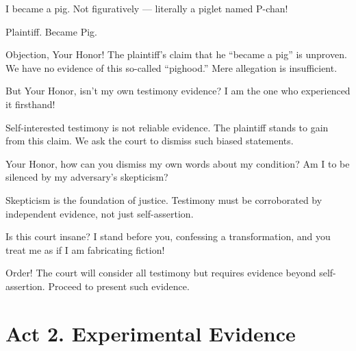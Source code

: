 \documentclass[12pt]{article}
\begin{document}
\begin{tcolorbox}[title={Ryoga (continued):}]
I became a pig. Not figuratively — literally a piglet named P-chan!
\end{tcolorbox}

\begin{tcolorbox}[title={Court Clerk (scribbling):}]
Plaintiff. Became Pig.
\end{tcolorbox}

\begin{tcolorbox}[title={Manager (objecting):}]
Objection, Your Honor! The plaintiff’s claim that he “became a pig” is unproven. We have no evidence of this so-called “pighood.” Mere allegation is insufficient.
\end{tcolorbox}

\begin{tcolorbox}[title=Ryoga:]
But Your Honor, isn’t my own testimony evidence? I am the one who experienced it firsthand!
\end{tcolorbox}

\begin{tcolorbox}[title=Manager:]
Self-interested testimony is not reliable evidence. The plaintiff stands to gain from this claim. We ask the court to dismiss such biased statements.
\end{tcolorbox}

\begin{tcolorbox}[title=Ryoga:]
Your Honor, how can you dismiss my own words about my condition? Am I to be silenced by my adversary’s skepticism?
\end{tcolorbox}

\begin{tcolorbox}[title=Manager:]
Skepticism is the foundation of justice. Testimony must be corroborated by independent evidence, not just self-assertion.
\end{tcolorbox}

\begin{tcolorbox}[title={Ryoga (exasperated):}]
Is this court insane? I stand before you, confessing a transformation, and you treat me as if I am fabricating fiction!
\end{tcolorbox}

\begin{tcolorbox}[title={Judge (firmly):}]
Order! The court will consider all testimony but requires evidence beyond self-assertion. Proceed to present such evidence.
\end{tcolorbox}

\section*{Act 2. Experimental Evidence}
\end{document}
